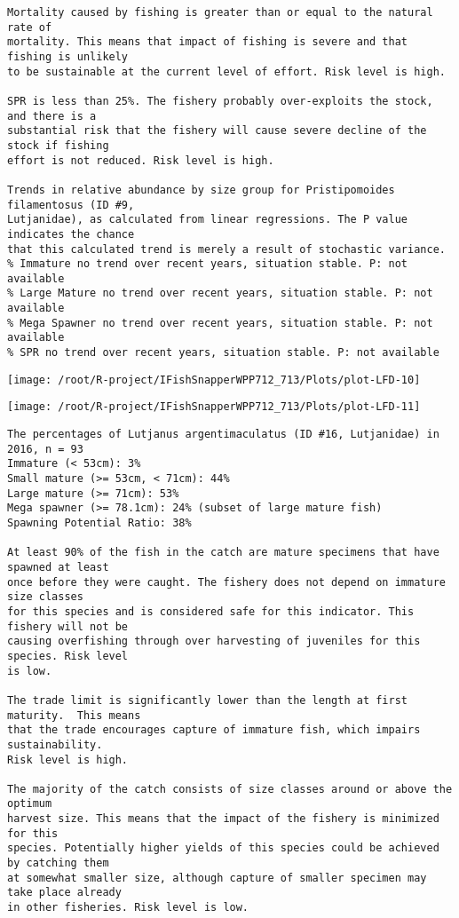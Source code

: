 \documentclass{report}\usepackage[]{graphicx}\usepackage[]{color}
\makeatletter
\def\maxwidth{ %
  \ifdim\Gin@nat@width>\linewidth
    \linewidth
  \else
    \Gin@nat@width
  \fi
}
\newenvironment{kframe}{%
 \def\at@end@of@kframe{}%
 \ifinner\ifhmode%
  \def\at@end@of@kframe{\end{minipage}}%
  \begin{minipage}{\columnwidth}%
 \fi\fi%
 \def\FrameCommand##1{\hskip\@totalleftmargin \hskip-\fboxsep
 \colorbox{shadecolor}{##1}\hskip-\fboxsep
     \hskip-\linewidth \hskip-\@totalleftmargin \hskip\columnwidth}%
 \MakeFramed {\advance\hsize-\width
   \@totalleftmargin\z@ \linewidth\hsize
   \@setminipage}}%
 {\par\unskip\endMakeFramed%
 \at@end@of@kframe}
\newenvironment{knitrout}{}{} %
\makeatother
\begin{document}
\begin{knitrout}
\begin{kframe}
\begin{verbatim}
Mortality caused by fishing is greater than or equal to the natural rate of
mortality. This means that impact of fishing is severe and that fishing is unlikely
to be sustainable at the current level of effort. Risk level is high.
 
SPR is less than 25%. The fishery probably over-exploits the stock, and there is a
substantial risk that the fishery will cause severe decline of the stock if fishing
effort is not reduced. Risk level is high.
 
Trends in relative abundance by size group for Pristipomoides filamentosus (ID #9,
Lutjanidae), as calculated from linear regressions. The P value indicates the chance
that this calculated trend is merely a result of stochastic variance.
% Immature no trend over recent years, situation stable. P: not available
% Large Mature no trend over recent years, situation stable. P: not available
% Mega Spawner no trend over recent years, situation stable. P: not available
% SPR no trend over recent years, situation stable. P: not available
\end{verbatim}
\end{kframe}
\texttt{[image: /root/R-project/IFishSnapperWPP712\_713/Plots/plot-LFD-10]} 

\texttt{[image: /root/R-project/IFishSnapperWPP712\_713/Plots/plot-LFD-11]} 
\begin{kframe}\begin{verbatim}
The percentages of Lutjanus argentimaculatus (ID #16, Lutjanidae) in 2016, n = 93
Immature (< 53cm): 3%
Small mature (>= 53cm, < 71cm): 44%
Large mature (>= 71cm): 53%
Mega spawner (>= 78.1cm): 24% (subset of large mature fish)
Spawning Potential Ratio: 38%
 
At least 90% of the fish in the catch are mature specimens that have spawned at least
once before they were caught. The fishery does not depend on immature size classes
for this species and is considered safe for this indicator. This fishery will not be
causing overfishing through over harvesting of juveniles for this species. Risk level
is low.

The trade limit is significantly lower than the length at first maturity.  This means
that the trade encourages capture of immature fish, which impairs sustainability.
Risk level is high.

The majority of the catch consists of size classes around or above the optimum
harvest size. This means that the impact of the fishery is minimized for this
species. Potentially higher yields of this species could be achieved by catching them
at somewhat smaller size, although capture of smaller specimen may take place already
in other fisheries. Risk level is low.


\end{verbatim}
\end{kframe}
\end{knitrout}
\end{document}
